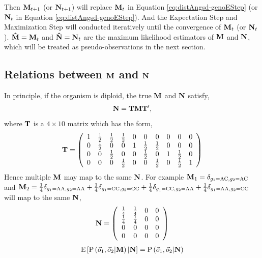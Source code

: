 \documentclass{article}
\begin{document}
Then ${\bf M}_{t+1}$ (or ${\bf N}_{t+1}$) will replace ${\bf M}_{t}$ in Equation \ref{eq:distAngsd-genoEStep} (or ${\bf N}_{t}$ in Equation \ref{eq:distAngsd-genoEStep}). And the Expectation Step and Maximization Step will conducted iteratively until the convergence of ${\bf M}_{t}$ (or ${\bf N}_{t}$). ${\bf \hat{M}}={\bf M}_{t}$ and ${\bf \hat{N}}={\bf N}_{t}$ are the maximum likelihood estimators of ${\bf M}$ and ${\bf N}$, which will be treated as pseudo-observations in the next section.
\subsection{Relations between $\bf M$ and $\bf N$}
In principle, if the organism is diploid, the true $\bf M$ and $\bf N$ satisfy,
\begin{align}
{\bf N}={\bf T}{\bf M}{\bf T}',\label{eq:MNrelation}
\end{align}
where ${\bf T}$ is a $4\times 10$ matrix which has the form,
\begin{align*}
{\bf T}=\left(\begin{array}{cccccccccc}
     1& \frac{1}{2} &\frac{1}{2} & \frac{1}{2} & 0 & 0 & 0 & 0 & 0 & 0\\
     0& \frac{1}{2} & 0 & 0 & 1 & \frac{1}{2} & \frac{1}{2}& 0 & 0 & 0\\
     0&  0& \frac{1}{2} & 0 & 0 & \frac{1}{2} & 0 & 1 & \frac{1}{2}& 0\\
     0&  0 & 0 & \frac{1}{2} & 0 & 0 & \frac{1}{2} & 0 & \frac{1}{2}& 1
\end{array}
\right)
\end{align*}
Hence multiple $\bf M$ may map to the same $\bf N$. For example ${\bf M}_1 = \delta_{g_1=\mathrm{AC},g_2=\mathrm{AC}}$ and ${\bf M}_2 =  \frac{1}{4}\delta_{g_1=\mathrm{AA},g_2=\mathrm{AA}}+\frac{1}{4}\delta_{g_1=\mathrm{CC},g_2=\mathrm{CC}}+\frac{1}{4}\delta_{g_1=\mathrm{CC},g_2=\mathrm{AA}}+\frac{1}{4}\delta_{g_1=\mathrm{AA},g_2=\mathrm{CC}}$ will map to the same $\bf N$,
\begin{align*}
    {\bf N}=\left(\begin{array}{cccc}
     \frac{1}{4}& \frac{1}{4} & 0 & 0 \\
     \frac{1}{4}& \frac{1}{4} & 0 & 0 \\
     0&  0& 0 & 0 \\
     0&  0 & 0 & 0 
\end{array}
\right)
\end{align*}
\begin{align*}
    \mathrm{E}\left[\mathrm{P}\left(\vec{o}_1,\vec{o}_2|{\bf M}\right)|{\bf N}\right]=\mathrm{P}\left(\vec{o}_1,\vec{o}_2|{\bf N}\right)
\end{align*}
\end{document}

